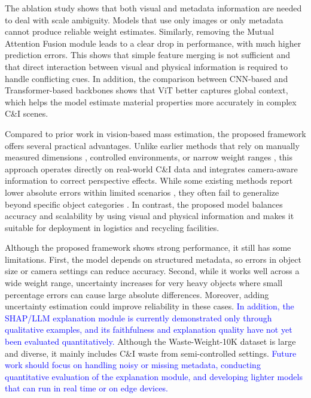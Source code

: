 \documentclass[journal,twoside,web]{ieeecolor}
\newcommand{\x}[1]{\textcolor{blue}{#1}}
\begin{document}
The ablation study shows that both visual and metadata information are needed to deal with scale ambiguity. Models that use only images or only metadata cannot produce reliable weight estimates. Similarly, removing the Mutual Attention Fusion module leads to a clear drop in performance, with much higher prediction errors. This shows that simple feature merging is not sufficient and that direct interaction between visual and physical information is required to handle conflicting cues. In addition, the comparison between CNN-based and Transformer-based backbones shows that ViT better captures global context, which helps the model estimate material properties more accurately in complex C\&I scenes.

Compared to prior work in vision-based mass estimation, the proposed framework offers several practical advantages. Unlike earlier methods that rely on manually measured dimensions \cite{standley2017image2mass,wang2025image2mass++}, controlled environments, or narrow weight ranges \cite{sato2024image,lee2025scalable}, this approach operates directly on real-world C\&I data and integrates camera-aware information to correct perspective effects. While some existing methods report lower absolute errors within limited scenarios \cite{sato2024image,lee2025scalable,nath2024mass}, they often fail to generalize beyond specific object categories \cite{sato2024image}. In contrast, the proposed model balances accuracy and scalability by using visual and physical information and makes it suitable for deployment in logistics and recycling facilities.

Although the proposed framework shows strong performance, it still has some limitations. First, the model depends on structured metadata, so errors in object size or camera settings can reduce accuracy. Second, while it works well across a wide weight range, uncertainty increases for very heavy objects where small percentage errors can cause large absolute differences. Moreover, adding uncertainty estimation could improve reliability in these cases. \x{In addition, the SHAP/LLM explanation module is currently demonstrated only through qualitative examples, and its faithfulness and explanation quality have not yet been evaluated quantitatively.} Although the Waste-Weight-10K dataset is large and diverse, it mainly includes C\&I waste from semi-controlled settings. \x{Future work should focus on handling noisy or missing metadata, conducting quantitative evaluation of the explanation module, and developing lighter models that can run in real time or on edge devices.} 
\end{document}
